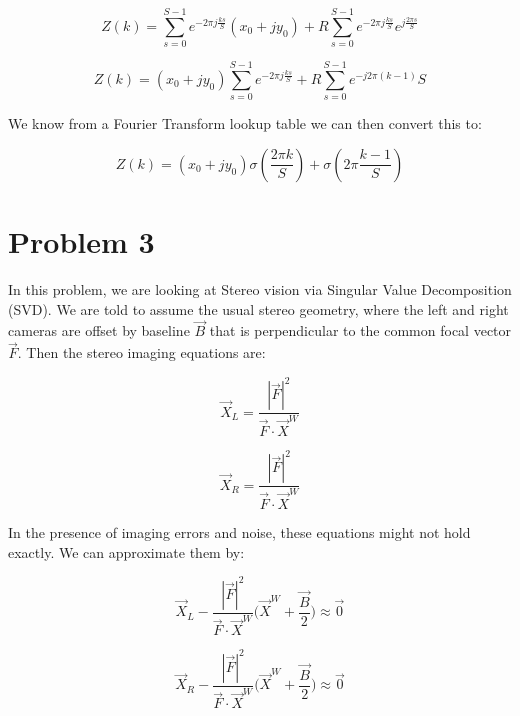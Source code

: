 \documentclass{article}
\begin{document}
\begin{equation}
    Z(k) = \sum^{S-1}_{s=0} e^{-2\pi j \frac{ks}{S}} (x_0 + jy_0) + R\sum^{S-1}_{s=0} e^{-2\pi j \frac{ks}{S}} e^{j\frac{2\pi s}{S}}
\end{equation}

\begin{equation}
    Z(k) = (x_0 + jy_0) \sum^{S-1}_{s=0} e^{-2\pi j \frac{ks}{S}}  + R\sum^{S-1}_{s=0} e^{-j 2 \pi (k-1)} S
\end{equation}

\noindent We know from a Fourier Transform lookup table we can then convert this to:

\begin{equation}
    Z(k) = (x_0+jy_0)\sigma(\frac{2\pi k}{S}) + \sigma(2\pi \frac{k-1}{S})
\end{equation}



\section*{Problem 3}

In this problem, we are looking at Stereo vision via Singular Value Decomposition (SVD). We are told to assume the usual stereo geometry, where the left and right cameras are offset by baseline $\vec{B}$ that is perpendicular to the common focal vector $\vec{F}$. Then the stereo imaging equations are:

\begin{equation}
    \vec{X}_L = \frac{|\vec{F}|^2}{\vec{F}\cdot \vec{X}^W}
\end{equation}

\begin{equation}
    \vec{X}_R = \frac{|\vec{F}|^2}{\vec{F}\cdot \vec{X}^W}
\end{equation}

\noindent In the presence of imaging errors and noise, these equations might not hold exactly. We can approximate them by:

\begin{equation}
    \vec{X}_L-\frac{|\vec{F}|^2}{\vec{F} \cdot \vec{X}^W}
    \bigl(
        \vec{X}^W + \frac{\vec{B}}{2}
    \bigr) \approx \vec{0}
\end{equation}

\begin{equation}
    \vec{X}_R-\frac{|\vec{F}|^2}{\vec{F} \cdot \vec{X}^W}
    \bigl(
        \vec{X}^W + \frac{\vec{B}}{2}
    \bigr) \approx \vec{0}
\end{equation}
\end{document}
